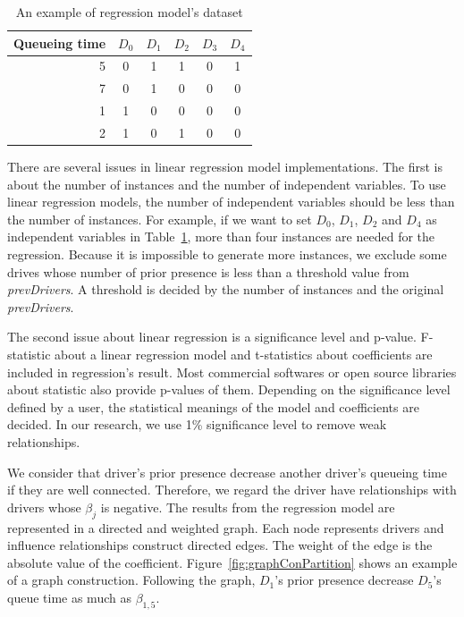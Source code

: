 \documentclass{article}
\begin{document}
\begin{table}[h]
	\caption{An example of regression model's dataset}
	\vspace{-0.3 cm}
	\begin{center}
		\begin{tabular}{r|ccccc}
		  Queueing time 	& $D_0$	& $D_1$	& $D_2$	& $D_3$	& $D_4$ \\
		  \hline
		  5					& 0		& 1		& 1		& 0	 & 1\\
		  7					& 0		& 1		& 0		& 0	 & 0\\
		  1					& 1		& 0		& 0		& 0	 & 0\\
		  2					& 1		& 0		& 1		& 0	 & 0
		\end{tabular}
	\label{tab:exampleInfluenceRegression}
	\end{center}
	\vspace{-0.3 cm}
\end{table}

There are several issues in linear regression model implementations. The first is about the number of instances and the number of independent variables. To use linear regression models, the number of independent variables should be less than the number of instances. For example, if we want to set $D_0$, $D_1$, $D_2$ and $D_4$ as independent variables in Table~\ref{tab:exampleInfluenceRegression}, more than four instances are needed for the regression. Because it is impossible to generate more instances, we exclude some drives whose number of prior presence is less than a threshold value from \emph{prevDrivers}. A threshold is decided by the number of instances and the original \emph{prevDrivers}.

The second issue about linear regression is a significance level and p-value. F-statistic about a linear regression model and t-statistics about coefficients are included in regression's result. Most commercial softwares or open source libraries about statistic also provide p-values of them. Depending on the significance level defined by a user, the statistical meanings of the model and coefficients are decided. In our research, we use 1\% significance level to remove weak relationships. 

We consider that driver's prior presence decrease another driver's queueing time if they are well connected. Therefore, we regard the driver have relationships with drivers whose $\beta_j$ is negative. The results from the regression model are represented in a directed and weighted graph. Each node represents drivers and influence relationships construct directed edges. The weight of the edge is the absolute value of the coefficient. Figure~\ref{fig:graphConPartition} shows an example of a graph construction. Following the graph, $D_1$'s prior presence decrease $D_5$'s queue time as much as $\beta_{1,5}$.
\end{document}
